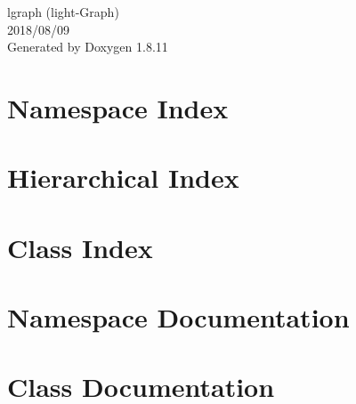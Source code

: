 \documentclass[twoside]{book}
\newcommand{\+}{\discretionary{\mbox{\scriptsize$\hookleftarrow$}}{}{}}
\newcommand{\clearemptydoublepage}{%
  \newpage{\pagestyle{empty}\cleardoublepage}%
}
\begin{document}
\hypersetup{pageanchor=false,
             bookmarksnumbered=true,
             pdfencoding=unicode
            }
\begin{titlepage}
\vspace*{7cm}
\begin{center}%
{\Large lgraph (light-\/\+Graph) \\[1ex]\large 2018/08/09 }\\
\vspace*{1cm}
{\large Generated by Doxygen 1.8.11}\\
\end{center}
\end{titlepage}
\clearemptydoublepage
\tableofcontents
\clearemptydoublepage
{}
\hypersetup{pageanchor=true}

\chapter{Namespace Index}

\chapter{Hierarchical Index}

\chapter{Class Index}

\chapter{Namespace Documentation}















\chapter{Class Documentation}

















\backmatter
\newpage
{}
\clearemptydoublepage
{}
\printindex
\end{document}
